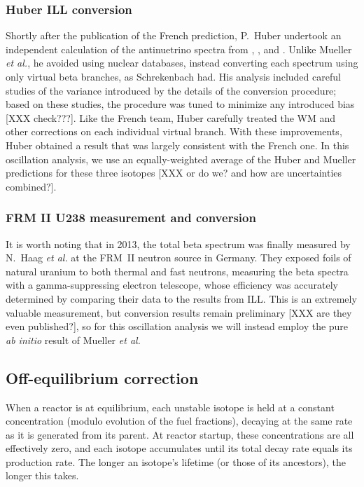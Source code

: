 \documentclass[../thesis.tex]{subfiles}
\begin{document}
\subsubsection{Huber ILL conversion}
\label{sec:huberconv}

Shortly after the publication of the French prediction, P.~Huber undertook an independent calculation of the antinuetrino spectra from \urfive, \punine, and \puone. Unlike Mueller \emph{et al.}, he avoided using nuclear databases, instead converting each spectrum using only virtual beta branches, as Schrekenbach had. His analysis included careful studies of the variance introduced by the details of the conversion procedure; based on these studies, the procedure was tuned to minimize any introduced bias [XXX check???]. Like the French team, Huber carefully treated the WM and other corrections on each individual virtual branch. With these improvements, Huber obtained a result that was largely consistent with the French one. In this oscillation analysis, we use an equally-weighted average of the Huber and Mueller predictions for these three isotopes [XXX or do we? and how are uncertainties combined?].

\subsubsection{FRM II U238 measurement and conversion}
\label{sec:u238conv}

It is worth noting that in 2013, the \ureight total beta spectrum was finally measured by N.~Haag \emph{et al.} at the FRM~II neutron source in Germany. They exposed foils of natural uranium to both thermal and fast neutrons, measuring the beta spectra with a gamma-suppressing electron telescope, whose efficiency was accurately determined by comparing their \urfive data to the results from ILL. This is an extremely valuable measurement, but conversion results remain preliminary [XXX are they even published?], so for this oscillation analysis we will instead employ the pure \emph{ab initio} result of Mueller \emph{et al.}

\subsection{Off-equilibrium correction}
\label{sec:offeqcorr}

When a reactor is at equilibrium, each unstable isotope is held at a constant concentration (modulo evolution of the fuel fractions), decaying at the same rate as it is generated from its parent. At reactor startup, these concentrations are all effectively zero, and each isotope accumulates until its total decay rate equals its production rate. The longer an isotope's lifetime (or those of its ancestors), the longer this takes.
\end{document}
